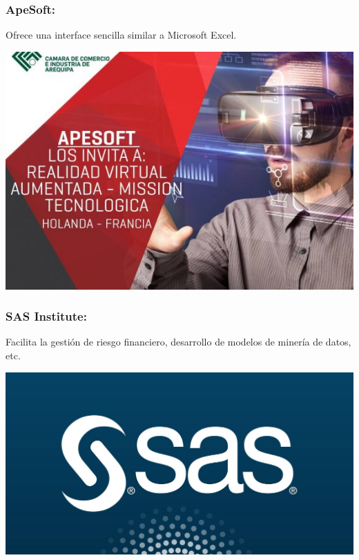 \subsubsection{ApeSoft: }\label{sec:nada2}  
Ofrece una interface sencilla similar a Microsoft Excel.
	\begin{center}
	\includegraphics[width=15cm]{./Imagenes/BIimagen18}
	\end{center}
	
\subsubsection{SAS Institute: }\label{sec:nada2}  
Facilita la gestión de riesgo financiero, desarrollo de modelos de minería de datos, etc.
	\begin{center}
	\includegraphics[width=15cm]{./Imagenes/BIimagen19}
	\end{center}
	

